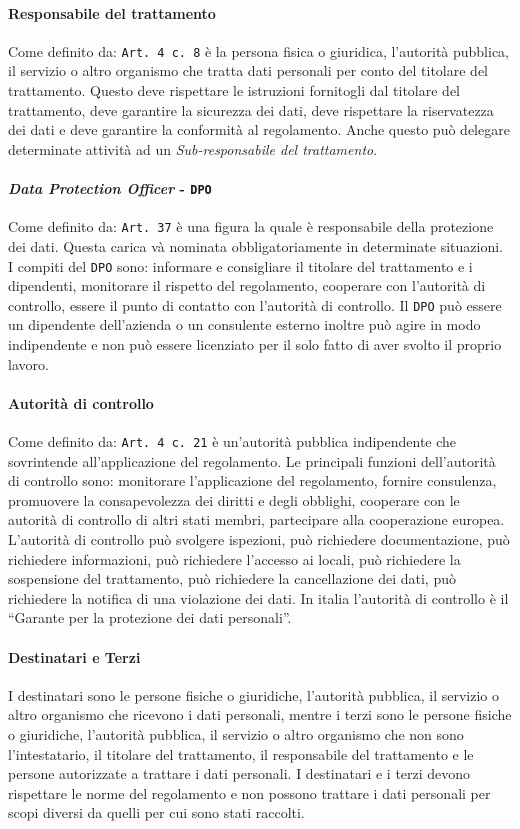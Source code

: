 {        \paragraph{Responsabile del trattamento} Come definito da: \texttt{Art. 4 c. 8} è la persona fisica o giuridica, l'autorità pubblica, il servizio o altro organismo che tratta dati personali per conto del titolare del trattamento. Questo deve rispettare le istruzioni fornitogli dal titolare del trattamento, deve garantire la sicurezza dei dati, deve rispettare la riservatezza dei dati e deve garantire la conformità al regolamento. Anche questo può delegare determinate attività ad un \textit{Sub-responsabile del trattamento}.
        \paragraph{\textit{Data Protection Officer} - \texttt{DPO}} Come definito da: \texttt{Art. 37} è una figura la quale è responsabile della protezione dei dati. Questa carica và nominata obbligatoriamente in determinate situazioni. I compiti del \texttt{DPO} sono: informare e consigliare il titolare del trattamento e i dipendenti, monitorare il rispetto del regolamento, cooperare con l'autorità di controllo, essere il punto di contatto con l'autorità di controllo. Il \texttt{DPO} può essere un dipendente dell'azienda o un consulente esterno inoltre può agire in modo indipendente e non può essere licenziato per il solo fatto di aver svolto il proprio lavoro.
        \paragraph{Autorità di controllo} Come definito da: \texttt{Art. 4 c. 21} è un'autorità pubblica indipendente che sovrintende all'applicazione del regolamento. Le principali funzioni dell'autorità di controllo sono: monitorare l'applicazione del regolamento, fornire consulenza, promuovere la consapevolezza dei diritti e degli obblighi, cooperare con le autorità di controllo di altri stati membri, partecipare alla cooperazione europea. L'autorità di controllo può svolgere ispezioni, può richiedere documentazione, può richiedere informazioni, può richiedere l'accesso ai locali, può richiedere la sospensione del trattamento, può richiedere la cancellazione dei dati, può richiedere la notifica di una violazione dei dati. In italia l'autorità di controllo è il ``Garante per la protezione dei dati personali''.
        \paragraph{Destinatari e Terzi} I destinatari sono le persone fisiche o giuridiche, l'autorità pubblica, il servizio o altro organismo che ricevono i dati personali, mentre i terzi sono le persone fisiche o giuridiche, l'autorità pubblica, il servizio o altro organismo che non sono l'intestatario, il titolare del trattamento, il responsabile del trattamento e le persone autorizzate a trattare i dati personali. I destinatari e i terzi devono rispettare le norme del regolamento e non possono trattare i dati personali per scopi diversi da quelli per cui sono stati raccolti.
}
